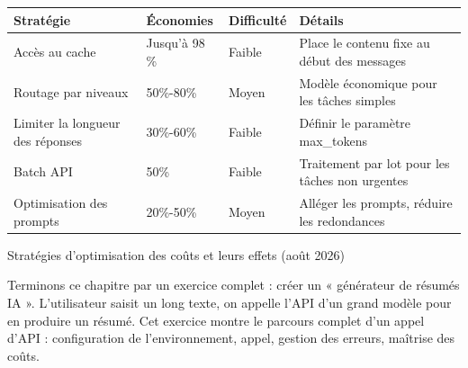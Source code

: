 \begin{center}
\begin{tabularx}{\linewidth}{|X|X|X|X|}
\hline
\textbf{Stratégie} & \textbf{Économies} & \textbf{Difficulté} & \textbf{Détails} \tabularnewline
\hline
Accès au cache & Jusqu'à 98 \% & Faible & Place le contenu fixe au début des messages \tabularnewline
Routage par niveaux & 50\%-80\% & Moyen & Modèle économique pour les tâches simples \tabularnewline
Limiter la longueur des réponses & 30\%-60\% & Faible & Définir le paramètre max\_tokens \tabularnewline
Batch API & 50\% & Faible & Traitement par lot pour les tâches non urgentes \tabularnewline
Optimisation des prompts & 20\%-50\% & Moyen & Alléger les prompts, réduire les redondances \tabularnewline
\hline
\end{tabularx}
\end{center}

\begin{center}\small\color{gray}Stratégies d'optimisation des coûts et leurs effets (août 2026)\end{center}


Terminons ce chapitre par un exercice complet : créer un « générateur de résumés IA ». L'utilisateur saisit un long texte, on appelle l'API d'un grand modèle pour en produire un résumé. Cet exercice montre le parcours complet d'un appel d'API : configuration de l'environnement, appel, gestion des erreurs, maîtrise des coûts.

